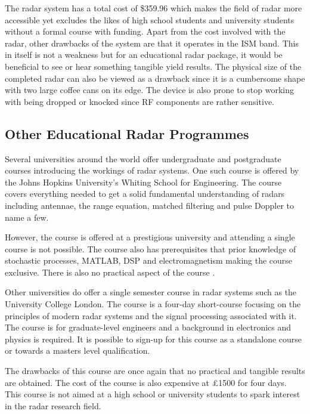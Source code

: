 The radar system has a total cost of \$359.96 \cite{charvat_mit_2011} which makes the field of radar more accessible yet excludes the likes of high school students and university students without a formal course with funding. Apart from the cost involved with the radar, other drawbacks of the system are that it operates in the ISM band. This in itself is not a weakness but for an educational radar package, it would be beneficial to see or hear something tangible yield results. The physical size of the completed radar can also be viewed as a drawback since it is a cumbersome shape with two large coffee cans on its edge. The device is also prone to stop working with being dropped or knocked since RF components are rather sensitive.

\subsection{Other Educational Radar Programmes}
Several universities around the world offer undergraduate and postgraduate courses introducing the workings of radar systems. One such course is offered by the Johns Hopkins University's Whiting School for Engineering. The course covers everything needed to get a solid fundamental understanding of radars including antennae, the range equation, matched filtering and pulse Doppler to name a few. 

However, the course is offered at a prestigious university and attending a single course is not possible. The course also has prerequisites that prior knowledge of stochastic processes, MATLAB, DSP and electromagnetism making the course exclusive. There is also no practical aspect of the course \cite{noauthor_525.648introduction_nodate}.

Other universities do offer a single semester course in radar systems such as the University College London. The course is a four-day short-course focusing on the principles of modern radar systems and the signal processing associated with it. The course is for graduate-level engineers and a background in electronics and physics is required. It is possible to sign-up for this course as a standalone course or towards a masters level qualification.

The drawbacks of this course are once again that no practical and tangible results are obtained. The cost of the course is also expensive at \pounds1500 for four days. This course is not aimed at a high school or university students to spark interest in the radar research field. 

